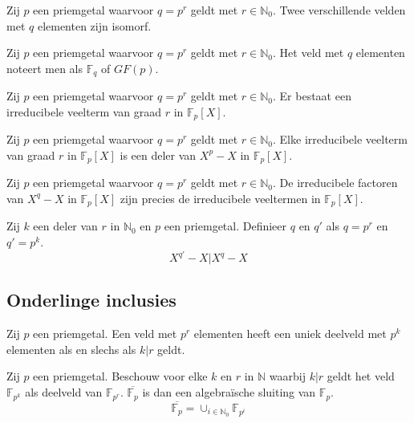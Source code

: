 \documentclass[main.tex]{subfiles}
\begin{document}
\begin{st}
  Zij $p$ een priemgetal waarvoor $q=p^{r}$ geldt met $r\in \mathbb{N}_{0}$.
  Twee verschillende velden met $q$ elementen zijn isomorf.
\end{st}

\begin{de}
  Zij $p$ een priemgetal waarvoor $q=p^{r}$ geldt met $r\in \mathbb{N}_{0}$.
  Het veld met $q$ elementen noteert men als $\mathbb{F}_{q}$ of $GF(p)$.
\end{de}

\begin{st}
  Zij $p$ een priemgetal waarvoor $q=p^{r}$ geldt met $r\in \mathbb{N}_{0}$.
  Er bestaat een irreducibele veelterm van graad $r$ in $\mathbb{F}_{p}[X]$.
\end{st}

\begin{st}
  Zij $p$ een priemgetal waarvoor $q=p^{r}$ geldt met $r\in \mathbb{N}_{0}$.
  Elke irreducibele veelterm van graad $r$ in $\mathbb{F}_{p}[X]$ is een deler van $X^{p}-X$ in $\mathbb{F}_{p}[X]$.
\end{st}

\begin{st}
  Zij $p$ een priemgetal waarvoor $q=p^{r}$ geldt met $r\in \mathbb{N}_{0}$.
  De irreducibele factoren van $X^{q}-X$ in $\mathbb{F}_{p}[X]$ zijn precies de irreducibele veeltermen in $\mathbb{F}_{p}[X]$.
\end{st}

\begin{lem}
  Zij $k$ een deler van $r$ in $\mathbb{N}_{0}$ en $p$ een priemgetal.
  Definieer $q$ en $q'$ als $q=p^{r}$ en $q'=p^{k}$.
  \[ X^{q'}-X | X^{q}-X \]
\end{lem}


\subsection{Onderlinge inclusies}
\label{sec:onderlinge-inclusies}

\begin{st}
  Zij $p$ een priemgetal.
  Een veld met $p^{r}$ elementen heeft een uniek deelveld met $p^{k}$ elementen als en slechs als $k|r$ geldt.
\end{st}

\begin{pr}
  Zij $p$ een priemgetal.
  Beschouw voor elke $k$ en $r$ in $\mathbb{N}$ waarbij $k|r$ geldt het veld $\mathbb{F}_{p^{k}}$ als deelveld van $\mathbb{F}_{p^{r}}$.
  $\overline{\mathbb{F}_{p}}$ is dan een algebra\"ische sluiting van $\mathbb{F}_{p}$.
  \[ \overline{\mathbb{F}_{p}} = \cup_{i\in \mathbb{N}_{0}}\mathbb{F}_{p^{i}} \]
\end{pr}
\end{document}
